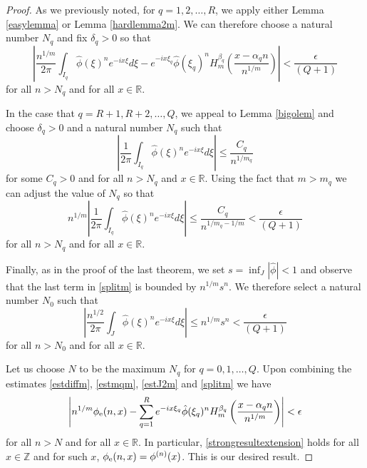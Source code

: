 \documentclass{article}
\theoremstyle{theorem}
\theoremstyle{remark}
\begin{document}
\begin{proof}
As we previously noted, for $q=1,2,\dots,R$, we apply either Lemma \ref{easylemma} or Lemma \ref{hardlemma2m}. We can therefore choose a natural number $N_q$ and fix $\delta_q>0$ so that 
\begin{equation}\label{estdiffm}
 \left|\frac{n^{1/m}}{2\pi}\int_{I_q}
\hat{\phi}(\xi)^ne^{-ix\xi}d\xi-e^{-ix\xi_q}\hat{\phi}(\xi_q)^n H_m^{\beta_q}\left(\frac{x-\alpha_qn}{n^{1/m}}\right)\right|<\frac{\epsilon}{(Q+1)}
\end{equation} for all $n>N_q$ and for all $x\in\mathbb{R}$.

In the case that $q=R+1,R+2,\dots, Q$, we appeal to Lemma \ref{bigolem} and choose $\delta_q>0$ and a natural number $N_q$ such that
\begin{equation*}
 \left|\frac{1}{2\pi}\int_{I_q}
\hat{\phi}(\xi)^ne^{-ix\xi}d\xi\right|\leq \frac{C_q}{n^{1/m_q}}
\end{equation*}
for some $C_q>0$ and for all $n>N_q$ and $x\in \mathbb{R}$. Using the fact that $m>m_q$ we can adjust the value of $N_q$ so that
\begin{equation}\label{estmqm}
n^{1/m}\left|\frac{1}{2\pi}\int_{I_q}
\hat{\phi}(\xi)^ne^{-ix\xi}d\xi\right|\leq \frac{C_q}{n^{1/m_q-1/m}}<\frac{\epsilon}{(Q+1)}
\end{equation}
for all $n>N_q$ and for all $x\in\mathbb{R}$.

Finally, as in the proof of the last theorem, we set $s=\inf_J |\hat{\phi}|<1$ and observe that the last term in \eqref{splitm} is bounded by $n^{1/m}s^n$. We therefore select a natural number $N_0$ such that
\begin{equation}\label{estJ2m}
 \left|\frac{n^{1/2}}{2\pi}\int_J \hat{\phi}(\xi)^ne^{-ix\xi}d\xi\right|\leq n^{1/m}s^n<\frac{\epsilon}{(Q+1)}
\end{equation}
for all $n>N_0$ and for all $x\in\mathbb{R}$.

Let us choose $N$ to be the maximum $N_q$ for $q=0,1,\dots,Q$. Upon combining the estimates \eqref{estdiffm}, \eqref{estmqm}, \eqref{estJ2m} and \eqref{splitm} we have
\begin{equation}\label{strongresultextension}
  \left|n^{1/m}\phi_{\mbox{\scriptsize{e}}}(n,x)-\sum_{q=1}^{R}e^{-ix\xi_q}\hat{\phi}(\xi_q)^n H_m^{\beta_q}\left(\frac{x-\alpha_qn}{n^{1/m}}\right)\right|<\epsilon
\end{equation}
for all $n>N$ and for all $x\in \mathbb{R}$. In particular, \eqref{strongresultextension} holds for all $x\in\mathbb{Z}$ and for such $x$, $\phi_{\mbox{\scriptsize{e}}}(n,x)=\phi^{(n)}(x)$. This is our desired result.
\end{proof}
\end{document}
